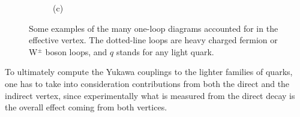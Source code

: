 \begin{figure}[!ht]
\begin{subfigure}[t]{0.333\mylength}
            \caption{\footnotesize (c)}
    \end{subfigure}%
    \caption{Some examples of the many one-loop diagrams accounted for in the effective vertex. The dotted-line loops are heavy charged fermion or W$^{\pm}$ boson loops, and $q$ stands for any light quark.}
    \label{fig:Higgs_decays_indirect}
    \vspace*{-0.0cm}
\end{figure}
To ultimately compute the Yukawa couplings to the lighter families of quarks, one has to take into consideration contributions from both the direct and the indirect vertex, since experimentally what is measured from the direct decay is the overall effect coming from both vertices.


